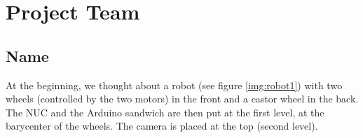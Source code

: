 \section{Project Team}\label{sec:team}

\subsection{Name}
At the beginning, we thought about a robot (see figure \ref{img:robot1}) with two wheels (controlled by the two motors) in the front and a castor wheel in the back. The NUC and the Arduino sandwich are then put at the first level, at the barycenter of the wheels. The camera is placed at the top (second level).